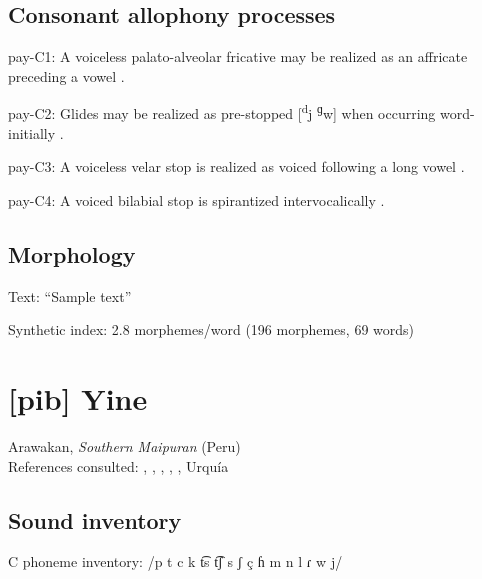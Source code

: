 {\subsection*{Consonant allophony processes}
\begin{appendixdesc}

\item[pay-C1:] A voiceless palato-alveolar fricative may be realized as an affricate preceding a vowel \citep[16]{Holt1999}.

\item[pay-C2:] Glides may be realized as pre-stopped [\textsuperscript{d}j \textsuperscript{ɡ}w] when occurring word-initially \citep[16]{Holt1999}.

\item[pay-C3:] A voiceless velar stop is realized as voiced following a long vowel \citep[15--16]{Holt1999}.

\item[pay-C4:] A voiced bilabial stop is spirantized intervocalically \citep[16]{Holt1999}.
\end{appendixdesc}
\subsection*{Morphology}

\begin{appendixdesc}

\item[Text:] “Sample text” \citep[79--80]{Holt1999}

\item[Synthetic index:] 2.8 morphemes/word (196 morphemes, 69 words)
\end{appendixdesc}
\section*{[pib] Yine}   %
Arawakan, \textit{Southern Maipuran} (Peru)\medskip\\
References consulted: \citet{Hanson2010}, \citet{Lin1993}, \citet{Lin1997}, \citet{Matteson1965}, \citet{Parker1989}, Urquía \citet{SebastiánMarlett2008}

\subsection*{Sound inventory}
\begin{appendixdesc}

\item[C phoneme inventory:] /p t c k t͡s t͡ʃ s ʃ ç ɦ m n l ɾ w j/


\end{appendixdesc}}
